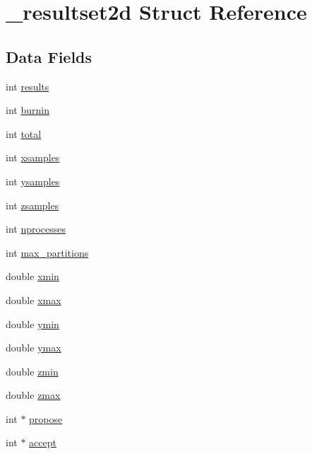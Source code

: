 \hypertarget{struct__resultset2d}{}\section{\+\_\+resultset2d Struct Reference}
\label{struct__resultset2d}
\subsection*{Data Fields}
\begin{DoxyCompactItemize}
\item 
int \hyperlink{struct__resultset2d_a0a5f3d334a6c3c77d5cd6a14a6fe42d5}{results}
\item 
int \hyperlink{struct__resultset2d_afa8584c9a4bf42e5b9548501c384ed5a}{burnin}
\item 
int \hyperlink{struct__resultset2d_a84ce623b8cf152f0705d8f5481e7d7ab}{total}
\item 
int \hyperlink{struct__resultset2d_a46cff8f7cf1d4a0908307bf499551dab}{xsamples}
\item 
int \hyperlink{struct__resultset2d_af402c640abad43978a89986c338bfc66}{ysamples}
\item 
int \hyperlink{struct__resultset2d_a3c7d9b5681c8ef831cefe6c1b6094114}{zsamples}
\item 
int \hyperlink{struct__resultset2d_a7c252fa7603e67e06f2020b73eb1d15d}{nprocesses}
\item 
int \hyperlink{struct__resultset2d_a78b12c8187bf99b00cc87944a65860e6}{max\+\_\+partitions}
\item 
double \hyperlink{struct__resultset2d_af3147bc5fd1e8e27fdcf25de615101a3}{xmin}
\item 
double \hyperlink{struct__resultset2d_a0eb234ad987c834ab45b50d881ff688f}{xmax}
\item 
double \hyperlink{struct__resultset2d_ab7acf7a5152f560c9f773992699b36d4}{ymin}
\item 
double \hyperlink{struct__resultset2d_ae24d2c2d285e258f8278e14da77944b6}{ymax}
\item 
double \hyperlink{struct__resultset2d_a7f406b61e406be2ac8c2c2b14097055e}{zmin}
\item 
double \hyperlink{struct__resultset2d_a518fa09d7885eede64e76b76f81cbd4a}{zmax}
\item 
int $\ast$ \hyperlink{struct__resultset2d_a6cf5a6140d366ba6ffb3e391208b660d}{propose}
\item 
int $\ast$ \hyperlink{struct__resultset2d_afab488a69a8bcc69d0cc4cf7df762aaa}{accept}

\end{DoxyCompactItemize}
